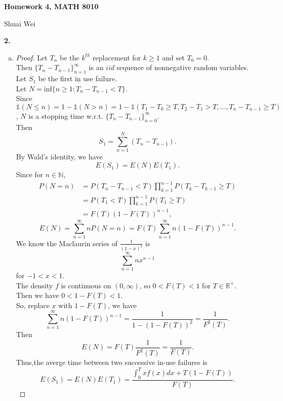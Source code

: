 \documentclass[12pt]{extarticle}
\newcommand{\idca}{\mathbb{1}}
\newcommand{\bbr}{\mathbb{R}}
\newcommand{\bbn}{\mathbb{N}}
\theoremstyle{plain}
\theoremstyle{definition}
\begin{document}
\begin{center}
    \textbf{Homework 4, MATH 8010}

	Shuai Wei 
\end{center}

\noindent \textbf{2.} \\
\begin{enumerate}[(b)]
	\item
	\begin{proof}
	  Let $T_n$ be the $k^{th}$ replacement for $k \geq 1$ and set $T_{0} = 0$.\\
	  Then $\{T_n-T_{n-1}\}_{n=1}^{\infty}$ is an $iid$ sequence of nonnegative random variables.
		Let $S_1$ be the first in use failure.\\
		Let $N = \text{inf}\{n \geq 1: T_{n}-T_{n-1} < T\}$.\\
	  	Since $\idca(N \leq n) = 1-\idca(N > n) = 1-\idca(T_{1}-T_{0} \geq T, T_{2}-T_{1}> T,...,T_{n}-T_{n-1} \geq T)$, $N$ is a stopping time w.r.t. $\{T_n-T_{n-1}\}_{n=0}^{\infty}$.\\
	  	Then 
	  	\[S_1 = \sum_{n=1}^{N}(T_n-T_{n-1}).\]
	  	By Wald's identity, we have 
	  	\[E(S_1) = E(N)E(T_1).\]
		Since for $n \in \bbn$, 
		\begin{align*}
		  P(N=n) &=P(T_n-T_{n-1} < T)\prod_{k=1}^{n-1}P(T_k-T_{k-1} \geq T) \\
				 	&=P(T_1 < T)\prod_{k=1}^{n-1}P(T_1 \geq T) \\
		  			&=F(T)\left(1-F(T)\right)^{n-1}, 
	  	\end{align*}
		\[E(N) = \sum_{n=1}^{\infty}nP(N=n) = F(T)\sum_{n=1}^{\infty}n\left(1-F(T)\right)^{n-1}. \]
		We know the Maclaurin series of $\frac{1}{(1-x)^2}$ is 
		\[ \sum_{n=1}^{\infty}nx^{n-1}\] 
		for $-1 < x < 1$.\\
	    The density $f$ is continuous on $(0,\infty)$, so $0 < F(T) < 1$ for $T \in \bbr^+$.\\
	    Then we have $0 < 1-F(T) < 1$.\\
	    So, replace $x$ with $1-F(T)$, we have 
	    \[ \sum_{n=1}^{\infty}n\left(1-F(T)\right)^{n-1} = \frac{1}{1-\left(1-F(T)\right)^2} = \frac{1}{F^2(T)}. \] 
		Then 
	    \[E(N) = F(T)\frac{1}{F^2(T)} = \frac{1}{F(T)}.\]
	    Thus,the averge time between two successive in-use failures is
	    \[E(S_1) = E(N)E(T_1) = \frac{\int_0^Txf(x)dx+T\left(1-F(T)\right)}{F(T)}.\]

	\end{proof}
\end{enumerate}
\end{document}
